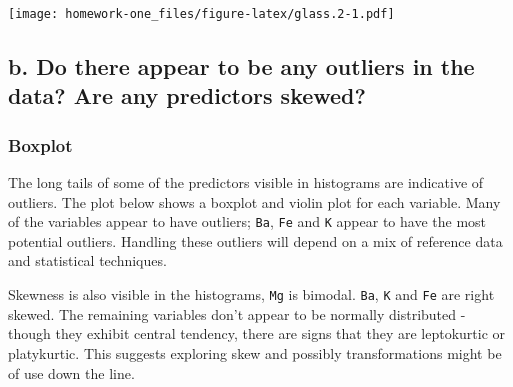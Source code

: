 \documentclass[openany]{book}
\begin{document}
\texttt{[image: homework-one\_files/figure-latex/glass.2-1.pdf]}

\hypertarget{b.-do-there-appear-to-be-any-outliers-in-the-data-are-any-predictors-skewed}{%
\subsection{b. Do there appear to be any outliers in the data? Are any predictors skewed?}\label{b.-do-there-appear-to-be-any-outliers-in-the-data-are-any-predictors-skewed}}

\hypertarget{boxplot}{%
\subsubsection{Boxplot}\label{boxplot}}

The long tails of some of the predictors visible in histograms are indicative of outliers. The plot below shows a boxplot and violin plot for each variable. Many of the variables appear to have outliers; \texttt{Ba}, \texttt{Fe} and \texttt{K} appear to have the most potential outliers. Handling these outliers will depend on a mix of reference data and statistical techniques.

Skewness is also visible in the histograms, \texttt{Mg} is bimodal. \texttt{Ba}, \texttt{K} and \texttt{Fe} are right skewed. The remaining variables don't appear to be normally distributed - though they exhibit central tendency, there are signs that they are leptokurtic or platykurtic. This suggests exploring skew and possibly transformations might be of use down the line.
\end{document}
